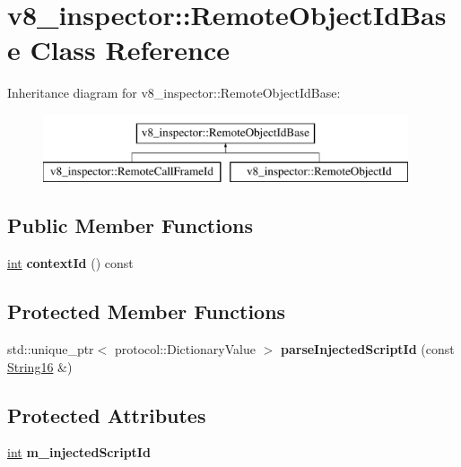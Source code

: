 \hypertarget{classv8__inspector_1_1RemoteObjectIdBase}{}\section{v8\+\_\+inspector\+:\+:Remote\+Object\+Id\+Base Class Reference}
\label{classv8__inspector_1_1RemoteObjectIdBase}
Inheritance diagram for v8\+\_\+inspector\+:\+:Remote\+Object\+Id\+Base\+:\begin{figure}[H]
\begin{center}
\leavevmode
\includegraphics[height=2.000000cm]{classv8__inspector_1_1RemoteObjectIdBase}
\end{center}
\end{figure}
\subsection*{Public Member Functions}
\begin{DoxyCompactItemize}
\item 
\mbox{\label{classv8__inspector_1_1RemoteObjectIdBase_ae1a7e40468146b2a75918cbe4e0c03c1}} 
\mbox{\hyperlink{classint}{int}} {\bfseries context\+Id} () const
\end{DoxyCompactItemize}
\subsection*{Protected Member Functions}
\begin{DoxyCompactItemize}
\item 
\mbox{\label{classv8__inspector_1_1RemoteObjectIdBase_afe150564c8e7689afa5fb034e24c7520}} 
std\+::unique\+\_\+ptr$<$ protocol\+::\+Dictionary\+Value $>$ {\bfseries parse\+Injected\+Script\+Id} (const \mbox{\hyperlink{classv8__inspector_1_1String16}{String16}} \&)
\end{DoxyCompactItemize}
\subsection*{Protected Attributes}
\begin{DoxyCompactItemize}
\item 
\mbox{\label{classv8__inspector_1_1RemoteObjectIdBase_a6f10fa2e25f1231f28d3d1778ddef68f}} 
\mbox{\hyperlink{classint}{int}} {\bfseries m\+\_\+injected\+Script\+Id}
\end{DoxyCompactItemize}


